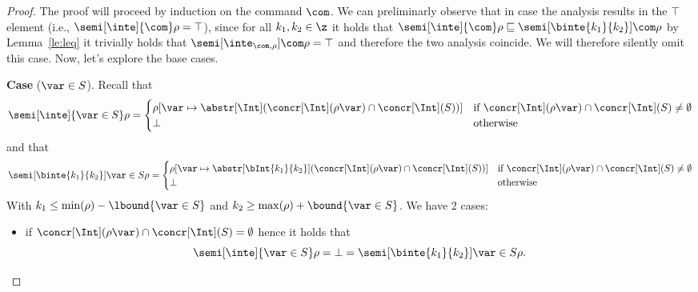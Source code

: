 \begin{proof}

  The proof will proceed by induction on the command \(\com\). We can
  preliminarly observe that in case the analysis results in the
  \(\top\) element (i.e., \({\semi[\inte]{\com}\rho = \top}\)), since
  for all \(k_1,k_2 \in \z\) it holds that
  \(\semi[\inte]{\com}\rho \sqsubseteq
  \semi[\binte{k_1}{k_2}]{\com}\rho\) by Lemma~\ref{le:leq} it
  trivially holds that \(\semi[\inte_{\com,\rho}]{\com}\rho = \top\)
  and therefore the two analysis coincide. We will therefore silently
  omit this case.  Now, let's explore the base cases.

  \medskip
  
  \noindent
  \textbf{Case} (\(\var \in S\)).
  Recall that
  \begin{equation*}
    \semi[\inte]{\var \in S}\rho = \begin{cases}
      \rho[\var \mapsto \abstr[\Int](\concr[\Int](\rho\var) \cap \concr[\Int](S))] & \text{if } \concr[\Int](\rho\var) \cap \concr[\Int](S) \neq \emptyset \\
      \bot & \text{otherwise}
    \end{cases}
  \end{equation*}
  and that
  \begin{equation*}
    \semi[\binte{k_1}{k_2}]{\var \in S}\rho = \begin{cases}

      \rho[\var \mapsto \abstr[\bInt{k_1}{k_2}](\concr[\Int](\rho\var) \cap \concr[\Int](S))] & \text{if } \concr[\Int](\rho\var) \cap \concr[\Int](S) \neq \emptyset \\
      \bot & \text{otherwise}
    \end{cases}
  \end{equation*}
  With \(k_1 \leq \min(\rho) - \lbound{\var \in S}\) and
  \(k_2 \geq \max(\rho) + \bound{\var \in S}\). We have 2 cases:
  \begin{itemize}
  \item if
    \({\concr[\Int](\rho\var) \cap \concr[\Int](S) = \emptyset}\)
    hence it holds that
    \begin{equation*}
      \semi[\inte]{\var\in S}\rho = \bot = \semi[\binte{k_1}{k_2}]{\var \in S}\rho.
    \end{equation*}
    

\end{itemize}
\end{proof}
